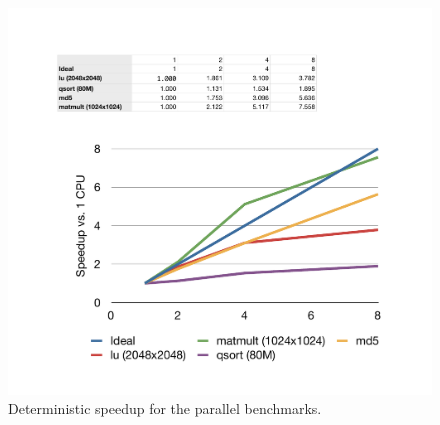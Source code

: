 
\begin{figure}[t]
\includegraphics[scale=.45]{dspeedup.pdf}
\caption{Deterministic speedup for the parallel benchmarks.}
\label{fig:dspeedup}
\end{figure}

\endinput

